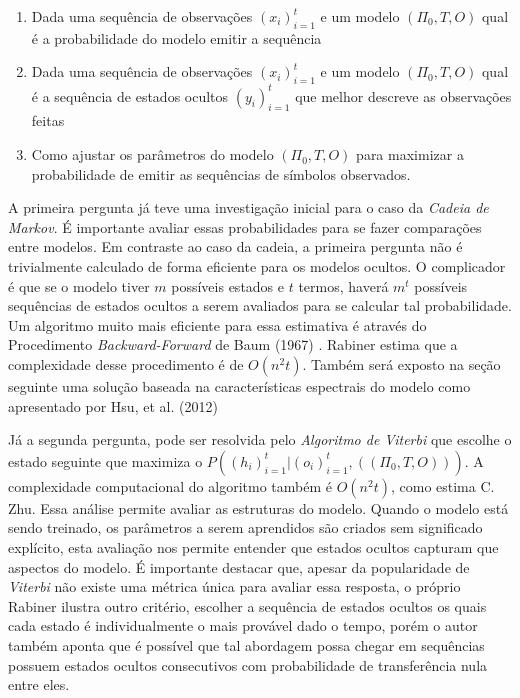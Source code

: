 \documentclass{subfiles}
\begin{document}
\begin{enumerate}
    \item Dada uma sequência de observações $(x_i)_{i=1}^t$ e um modelo $(\Pi_0, T, O)$ qual é a probabilidade do modelo emitir a sequência
    \item Dada uma sequência de observações $(x_i)_{i=1}^t$ e um modelo $(\Pi_0, T, O)$ qual é a sequência de estados ocultos $(y_i)_{i=1}^t$ que melhor descreve as observações feitas
    \item Como ajustar os parâmetros do modelo $(\Pi_0, T, O)$ para maximizar a probabilidade de emitir as sequências de símbolos observados.
\end{enumerate}
A primeira pergunta já teve uma investigação inicial para o caso da \textit{Cadeia de Markov}. É importante avaliar essas probabilidades para se fazer comparações entre modelos. Em contraste ao caso da cadeia, a primeira pergunta não é trivialmente calculado de forma eficiente para os modelos ocultos. O complicador é que se o modelo tiver $m$ possíveis estados e $t$ termos, haverá $m^t$ possíveis sequências de estados ocultos a serem avaliados para se calcular tal probabilidade. Um algoritmo muito mais eficiente para essa estimativa é através do Procedimento \textit{Backward-Forward} de Baum (1967) \autocite{Baum:1967AnIW}. Rabiner estima que a complexidade desse procedimento é de $O(n^2t)$. Também será exposto na seção seguinte uma solução baseada na características espectrais do modelo como apresentado por Hsu, et al. (2012) \autocite{Hsu:20121460}

Já a segunda pergunta, pode ser resolvida pelo \textit{Algoritmo de Viterbi} \autocite{Viterbi:1967EBFC} que escolhe o estado seguinte que maximiza o $P((h_i)_{i=1}^t \vert (o_i)_{i=1}^t, ((\Pi_0, T, O)))$. A complexidade computacional do algoritmo também é $O(n^2t)$, como estima C. Zhu\autocite{ZHU:202127}. Essa análise permite avaliar as estruturas do modelo. Quando o modelo está sendo treinado, os parâmetros a serem aprendidos são criados sem significado explícito, esta avaliação nos permite entender que estados ocultos capturam que aspectos do modelo. É importante destacar que, apesar da popularidade de \textit{Viterbi} não existe uma métrica única para avaliar essa resposta, o próprio Rabiner \autocite{Rabiner:1989tut} ilustra outro critério, escolher a sequência de estados ocultos os quais cada estado é individualmente o mais provável dado o tempo, porém o autor também aponta que é possível que tal abordagem possa chegar em sequências possuem estados ocultos consecutivos com probabilidade de transferência nula entre eles.
\end{document}
